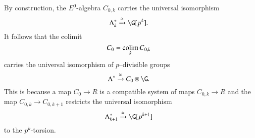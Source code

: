 By construction, the $E^0$-algebra $C_{0,k}$ carries the universal isomorphism
\[
\Lk^* \xrightarrow{\cong} \G[p^k].
\]
It follows that the colimit
\begin{equation} \label{c2}
C_0 = \operatorname*{colim}_{k} C_{0,k}
\end{equation}
carries the universal isomorphism of $p$--divisible groups
\[
\Lambda^* \xrightarrow{\cong} C_0 \otimes \G.
\]
This is because a map $C_0 \rightarrow R$ is a compatible system of maps $C_{0,k} \rightarrow R$ and the map $C_{0,k} \rightarrow C_{0,k+1}$ restricts the universal isomorphism
\[
\Lambda_{k+1}^{*} \xrightarrow{\cong} \G[p^{k+1}]
\]
to the $p^k$-torsion.
%
%




